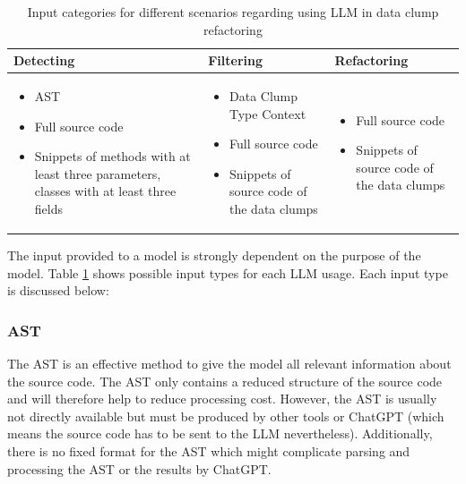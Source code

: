 \begin{table}[ht!]
    \centering
    \begin{tabular} {m{4cm} | m{4cm} | m{4cm}}
        Detecting & Filtering & Refactoring  \\\hline
         \begin{itemize}
             \item AST
             \item Full source code 
             \item Snippets of methods with at least three parameters, classes with at least three fields
         \end{itemize} & \begin{itemize}
             \item Data Clump Type Context
             \item Full source code
             \item Snippets of source code of the data clumps
         \end{itemize} & \begin{itemize}
             \item Full source code 
             \item Snippets of source code of the data clumps
         \end{itemize}
    \end{tabular}
    \caption{Input categories for different scenarios regarding using \ac{LLM} in data clump refactoring}
    \label{tab:data_clump_llm_input}
\end{table}

The input provided to a model is strongly dependent on the purpose of the model. Table \ref{tab:data_clump_llm_input} shows possible input types for each \ac{LLM} usage. Each input type is discussed below:

\subsubsection{AST}

The \ac{AST} is an effective method to give the model all relevant information about the source code.  The \ac{AST} only contains a reduced structure of the source code and will therefore help to reduce processing cost. However, the \ac{AST} is usually not directly available but must be produced by other tools or ChatGPT (which means the source code has to be sent to the \ac{LLM} nevertheless). Additionally, there is no fixed format for the \ac{AST} which might complicate parsing and processing the \ac{AST} or the results by ChatGPT.

